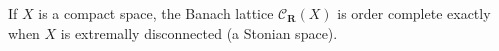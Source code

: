 If $X$ is a compact space, the Banach lattice $\mathcal{C}_{\mathbf{R}}(X)$ is order complete exactly when $X$ is extremally disconnected (a Stonian space).
